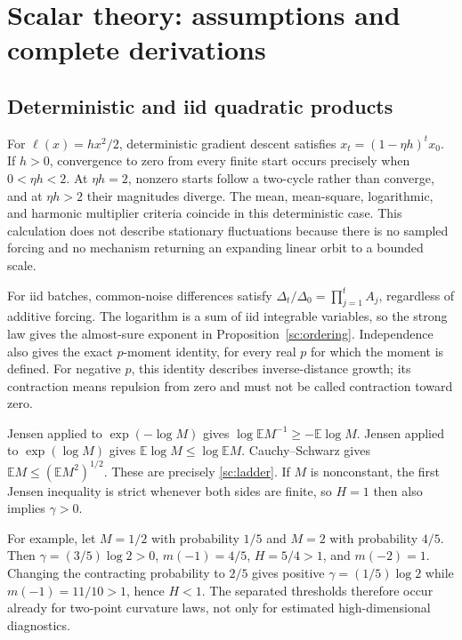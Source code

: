 \section{Scalar theory: assumptions and complete derivations}\label{sc:proofs}

\subsection{Deterministic and iid quadratic products}
For \(\ell(x)=hx^2/2\), deterministic gradient descent satisfies
\(x_t=(1-\eta h)^t x_0\). If \(h>0\), convergence to zero from every
finite start occurs precisely when \(0<\eta h<2\). At \(\eta h=2\),
nonzero starts follow a two-cycle rather than converge, and at
\(\eta h>2\) their magnitudes diverge. The mean, mean-square, logarithmic,
and harmonic multiplier criteria coincide in this deterministic case.
This calculation does not describe stationary fluctuations because
there is no sampled forcing and no mechanism returning an expanding
linear orbit to a bounded scale.

For iid batches, common-noise differences satisfy
\(\Delta_t/\Delta_0=\prod_{j=1}^t A_j\), regardless of additive forcing.
The logarithm is a sum of iid integrable variables, so the strong law
gives the almost-sure exponent in Proposition~\ref{sc:ordering}.
Independence also gives the exact \(p\)-moment identity, for every real
\(p\) for which the moment is defined. For negative \(p\), this identity
describes inverse-distance growth; its contraction means repulsion from
zero and must not be called contraction toward zero.

Jensen applied to \(\exp(-\log M)\) gives
\(\log\mathbb E M^{-1}\ge-\mathbb E\log M\). Jensen applied to
\(\exp(\log M)\) gives \(\mathbb E\log M\le\log\mathbb E M\).
Cauchy--Schwarz gives \(\mathbb E M\le(\mathbb E M^2)^{1/2}\).
These are precisely \eqref{sc:ladder}. If \(M\) is nonconstant, the
first Jensen inequality is strict whenever both sides are finite, so
\(H=1\) then also implies \(\gamma>0\).

For example, let \(M=1/2\) with probability \(1/5\) and \(M=2\) with
probability \(4/5\). Then \(\gamma=(3/5)\log2>0\),
\(m(-1)=4/5\), \(H=5/4>1\), and \(m(-2)=1\).
Changing the contracting probability to \(2/5\) gives positive
\(\gamma=(1/5)\log2\) while \(m(-1)=11/10>1\), hence \(H<1\).
The separated thresholds therefore occur already for two-point curvature
laws, not only for estimated high-dimensional diagnostics.

